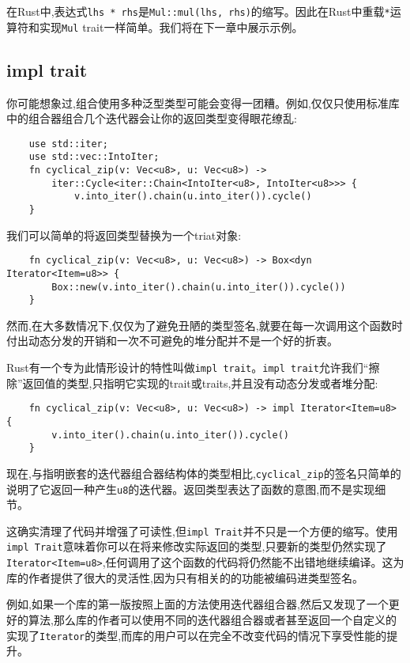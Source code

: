 在Rust中,表达式\texttt{lhs * rhs}是\texttt{Mul::mul(lhs, rhs)}的缩写。因此在Rust中重载\texttt{*}运算符和实现\texttt{Mul} trait一样简单。我们将在下一章中展示示例。

\subsection{impl trait}
你可能想象过,组合使用多种泛型类型可能会变得一团糟。例如,仅仅只使用标准库中的组合器组合几个迭代器会让你的返回类型变得眼花缭乱:
\begin{verbatim}
    use std::iter;
    use std::vec::IntoIter;
    fn cyclical_zip(v: Vec<u8>, u: Vec<u8>) ->
        iter::Cycle<iter::Chain<IntoIter<u8>, IntoIter<u8>>> {
            v.into_iter().chain(u.into_iter()).cycle()
    }
\end{verbatim}

我们可以简单的将返回类型替换为一个triat对象:
\begin{verbatim}
    fn cyclical_zip(v: Vec<u8>, u: Vec<u8>) -> Box<dyn Iterator<Item=u8>> {
        Box::new(v.into_iter().chain(u.into_iter()).cycle())
    }
\end{verbatim}

然而,在大多数情况下,仅仅为了避免丑陋的类型签名,就要在每一次调用这个函数时付出动态分发的开销和一次不可避免的堆分配并不是一个好的折衷。

Rust有一个专为此情形设计的特性叫做\texttt{impl trait}。\texttt{impl trait}允许我们“擦除”返回值的类型,只指明它实现的trait或traits,并且没有动态分发或者堆分配:
\begin{verbatim}
    fn cyclical_zip(v: Vec<u8>, u: Vec<u8>) -> impl Iterator<Item=u8> {
        v.into_iter().chain(u.into_iter()).cycle()
    }
\end{verbatim}

现在,与指明嵌套的迭代器组合器结构体的类型相比,\texttt{cyclical\_zip}的签名只简单的说明了它返回一种产生\texttt{u8}的迭代器。返回类型表达了函数的意图,而不是实现细节。

这确实清理了代码并增强了可读性,但\texttt{impl Trait}并不只是一个方便的缩写。使用\texttt{impl Trait}意味着你可以在将来修改实际返回的类型,只要新的类型仍然实现了\texttt{Iterator<Item=u8>},任何调用了这个函数的代码将仍然能不出错地继续编译。这为库的作者提供了很大的灵活性,因为只有相关的的功能被编码进类型签名。

例如,如果一个库的第一版按照上面的方法使用迭代器组合器,然后又发现了一个更好的算法,那么库的作者可以使用不同的迭代器组合器或者甚至返回一个自定义的实现了\texttt{Iterator}的类型,而库的用户可以在完全不改变代码的情况下享受性能的提升。

